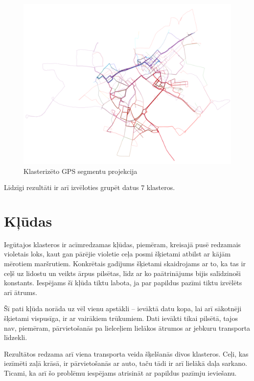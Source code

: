 \documentclass{ludis}
\begin{document}
\begin{figure}
  \centering
  \includegraphics[scale=0.45]{img/clustered_trails}
  \caption{Klasterizēto GPS segmentu projekcija}
  \label{fig:clustered_trails}
\end{figure}

Līdzīgi rezultāti ir arī izvēloties grupēt datus $7$ klasteros.

\section{Kļūdas}
Iegūtajos klasteros ir acīmredzamas kļūdas, piemēram, kreisajā pusē redzamais violetais loks, kaut
gan pārējie violetie ceļa posmi šķietami atbilst ar kājām mērotiem maršrutiem. Konkrētais gadījums
šķietami skaidrojams ar to, ka tas ir ceļš uz lidostu un veikts ārpus pilsētas, līdz ar ko
paātrinājums bijis salīdzinoši konstants. Iespējams šī kļūda tiktu labota, ja par papildus pazīmi
tiktu izvēlēts arī ātrums.

Šī pati kļūda norāda uz vēl vienu apstākli -- ievāktā datu kopa, lai arī sākotnēji šķietami 
vispusīga, ir ar vairākiem trūkumiem. Dati ievākti tikai pilsētā, tajos nav, piemēram, pārvietošanās
pa lielceļiem lielākos ātrumos ar jebkuru transporta līdzekli.

Rezultātos redzama arī viena transporta veida šķelšanās divos klasteros. Ceļi, kas iezīmēti zaļā
krāsā, ir pārvietošanās ar auto, taču tādi ir arī lielākā daļa sarkano. Ticami, ka arī šo
problēmu iespējams atrisināt ar papildus pazīmju ieviešanu.
\end{document}
